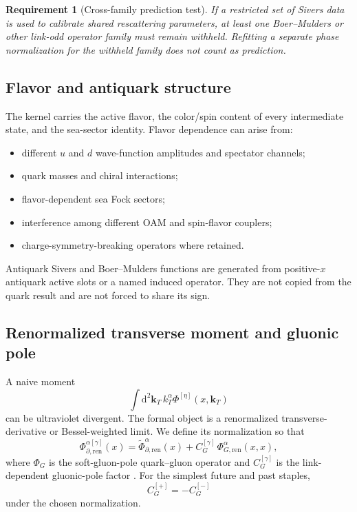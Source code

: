 \documentclass[11pt]{article}
\newtheorem{requirement}[definition]{Requirement}
\newcommand{\kT}{\bm{k}_{T}}
\newcommand{\dd}{\mathrm{d}}
\newcommand{\ren}{\mathrm{ren}}
\begin{document}
\begin{requirement}[Cross-family prediction test]
\label{req:cross-family-prediction}
If a restricted set of Sivers data is used to calibrate shared rescattering
parameters, at least one Boer--Mulders or other link-odd operator family must
remain withheld.  Refitting a separate phase normalization for the withheld
family does not count as prediction.
\end{requirement}

\subsection{Flavor and antiquark structure}

The kernel carries the active flavor, the color/spin content of every
intermediate state, and the sea-sector identity.  Flavor dependence can arise
from:
\begin{itemize}
\item different \(u\) and \(d\) wave-function amplitudes and spectator
      channels;
\item quark masses and chiral interactions;
\item flavor-dependent sea Fock sectors;
\item interference among different OAM and spin-flavor couplers;
\item charge-symmetry-breaking operators where retained.
\end{itemize}
Antiquark Sivers and Boer--Mulders functions are generated from positive-\(x\)
antiquark active slots or a named induced operator.  They are not copied from
the quark result and are not forced to share its sign.

\subsection{Renormalized transverse moment and gluonic pole}

A naive moment
\begin{equation}
 \int\dd^2\kT\,k_T^\alpha\Phi^{[\eta]}(x,\kT)
\label{eq:naive-transverse-moment}
\end{equation}
can be ultraviolet divergent.  The formal object is a renormalized
transverse-derivative or Bessel-weighted limit.  We define its normalization
so that
\begin{equation}
 \Phi_{\partial,\ren}^{\alpha[\gamma]}(x)
 =\widetilde\Phi_{\partial,\ren}^{\alpha}(x)
 +C_G^{[\gamma]}\,
 \Phi_{G,\ren}^{\alpha}(x,x),
\label{eq:quark-gluonic-pole-decomposition}
\end{equation}
where \(\Phi_G\) is the soft-gluon-pole quark--gluon operator and
\(C_G^{[\gamma]}\) is the link-dependent gluonic-pole factor
\cite{BoerMuldersPijlman2003,BuffingMulders2011}.  For the simplest future and
past staples,
\begin{equation}
 C_G^{[+]}=-C_G^{[-]}
\label{eq:quark-gluonic-pole-sign}
\end{equation}
under the chosen normalization.
\end{document}
